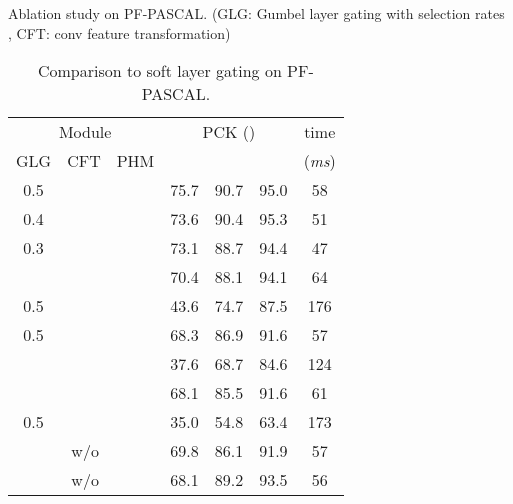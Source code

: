 \documentclass[runningheads]{llncs}
\newcommand{\cmark}{\ding{51}}
\begin{document}
\begin{table}[!t]
    \begin{minipage}{.51\linewidth}
        \caption{\label{tab:ablation_study}Ablation study on PF-PASCAL. (GLG: Gumbel layer gating with selection rates , CFT: conv feature transformation)}
        \begin{center}
            \begin{tabular}{ccccccc}
                
                    \toprule
                    \multicolumn{3}{c}{Module} & \multicolumn{3}{c}{PCK ()} & time \\
                    GLG & CFT & PHM  &  &  &  & ({\em ms}) \\ 
                    \midrule
                    0.5 & \cmark & \cmark & 75.7 & 90.7 & 95.0 & 58 \\
                    0.4 & \cmark & \cmark & 73.6 & 90.4 & 95.3 & 51 \\
                    0.3 & \cmark & \cmark & 73.1 & 88.7 & 94.4 & 47 \\
                    \midrule
                    & \cmark & \cmark & 70.4 & 88.1 & 94.1 & 64 \\
                    0.5 &  & \cmark & 43.6 & 74.7 & 87.5 & 176 \\ 
                    0.5 & \cmark & & 68.3 & 86.9 & 91.6 & 57 \\
                    &  & \cmark & 37.6 & 68.7 & 84.6 & 124 \\
                    & \cmark &  & 68.1 & 85.5 & 91.6 & 61 \\
                    0.5 &  &  & 35.0 & 54.8 & 63.4 & 173 \\
                    \midrule
                    \multicolumn{3}{c}{ w/o   } & 69.8 & 86.1 & 91.9 & 57 \\
                    \multicolumn{3}{c}{ w/o  } & 68.1 & 89.2 & 93.5 & 56 \\
                    \bottomrule
            \end{tabular}
        \end{center}
    \end{minipage}
    \begin{minipage}{.48\linewidth}
        \caption{\label{tab:ablation_study_gating}Comparison to soft layer gating on PF-PASCAL.}
            

\end{minipage}
\end{table}
\end{document}

